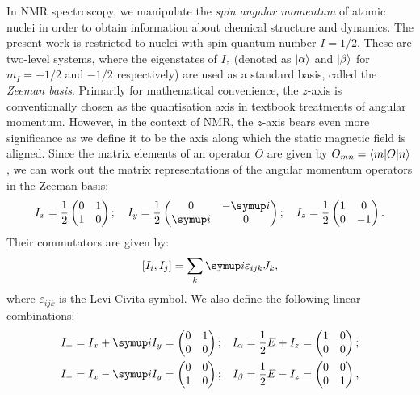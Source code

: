 In NMR spectroscopy, we manipulate the \textit{spin angular momentum} of atomic nuclei in order to obtain information about chemical structure and dynamics.
The present work is restricted to nuclei with spin quantum number $I = 1/2$.
These are two-level systems, where the eigenstates of $I_z$ (denoted as $\ket{\alpha}$ and $\ket{\beta}$ for $m_I = +1/2$ and $-1/2$ respectively) are used as a standard basis, called the \textit{Zeeman basis}.
Primarily for mathematical convenience, the $z$-axis is conventionally chosen as the quantisation axis in textbook treatments of angular momentum.
However, in the context of NMR, the $z$-axis bears even more significance as we define it to be the axis along which the static magnetic field is aligned.
Since the matrix elements of an operator $O$ are given by $O_{mn} = \braket{m|O|n}$, we can work out the matrix representations of the angular momentum operators in the Zeeman basis:
\begin{equation}
    \label{eq:pauli}
    I_x = \frac{1}{2}\begin{pmatrix} 0 & 1 \\ 1 & 0 \end{pmatrix}; \quad 
    I_y = \frac{1}{2}\begin{pmatrix} 0 & -\mi \\ \mi & 0 \end{pmatrix}; \quad 
    I_z = \frac{1}{2}\begin{pmatrix} 1 & 0 \\ 0 & -1 \end{pmatrix}.
\end{equation}
Their commutators are given by:
\begin{equation}
    \label{eq:angmom_commutators}
    [I_i, I_j] = \sum_{k} \mi \varepsilon_{ijk}J_k,
\end{equation}
where $\varepsilon_{ijk}$ is the Levi-Civita symbol.
We also define the following linear combinations:
\begin{equation}
    \label{eq:other_single_spin_ops}
    \begin{aligned}
        I_+ = I_x + \mi I_y &= \begin{pmatrix} 0 & 1 \\ 0 & 0 \end{pmatrix}; &
        I_\alpha = \frac{1}{2}E + I_z &= \begin{pmatrix} 1 & 0 \\ 0 & 0 \end{pmatrix}; \\
        I_- = I_x - \mi I_y &= \begin{pmatrix} 0 & 0 \\ 1 & 0 \end{pmatrix}; &
        I_\beta = \frac{1}{2}E - I_z &= \begin{pmatrix} 0 & 0 \\ 0 & 1 \end{pmatrix},
    \end{aligned}
\end{equation}
